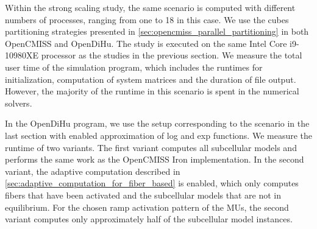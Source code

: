 Within the strong scaling study, the same scenario is computed with different numbers of processes, ranging from one to 18 in this case. We use the cubes partitioning strategies presented in \cref{sec:opencmiss_parallel_partitioning} in both OpenCMISS and OpenDiHu.
The study is executed on the same Intel Core i9-10980XE processor as the studies in the previous section.
We measure the total user time of the simulation program, which includes the runtimes for initialization, computation of system matrices and the duration of file output. However, the majority of the runtime in this scenario is spent in the numerical solvers.

In the OpenDiHu program, we use the setup corresponding to the  scenario in the last section with enabled approximation of log and exp functions. We measure the runtime of two variants. The first variant computes all subcellular models and performs the same work as the OpenCMISS Iron implementation. In the second variant, the adaptive computation described in \cref{sec:adaptive_computation_for_fiber_based} is enabled, which only computes fibers that have been activated and the subcellular models that are not in equilibrium. For the chosen ramp activation pattern of the MUs, the second variant computes only approximately half of the subcellular model instances.

